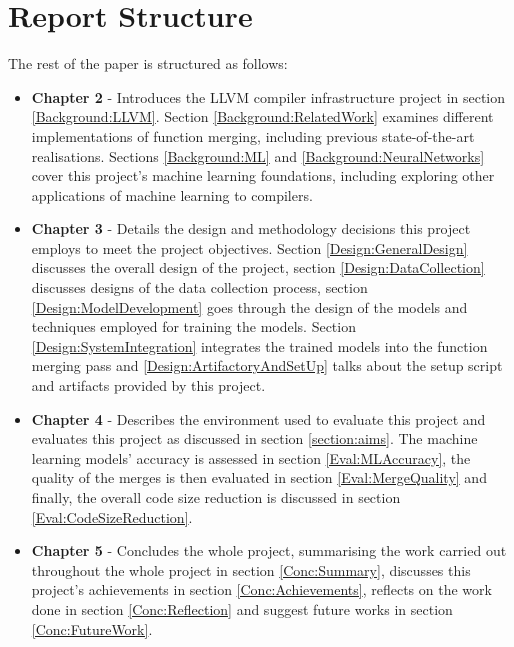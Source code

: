\section{Report Structure}
The rest of the paper is structured as follows:
\begin{itemize}
    \item \textbf{Chapter 2} - Introduces the LLVM compiler infrastructure project in section \ref{Background:LLVM}. Section \ref{Background:RelatedWork} examines different implementations of function merging, including previous state-of-the-art realisations. Sections \ref{Background:ML} and \ref{Background:NeuralNetworks} cover this project's machine learning foundations, including exploring other applications of machine learning to compilers.
    \item \textbf{Chapter 3} - Details the design and methodology decisions this project employs to meet the project objectives. Section \ref{Design:GeneralDesign} discusses the overall design of the project, section \ref{Design:DataCollection} discusses designs of the data collection process, section \ref{Design:ModelDevelopment} goes through the design of the models and techniques employed for training the models. Section \ref{Design:SystemIntegration} integrates the trained models into the function merging pass and \ref{Design:ArtifactoryAndSetUp} talks about the setup script and artifacts provided by this project.
    \item \textbf{Chapter 4} - Describes the environment used to evaluate this project and evaluates this project as discussed in section \ref{section:aims}. The machine learning models' accuracy is assessed in section \ref{Eval:MLAccuracy}, the quality of the merges is then evaluated in section \ref{Eval:MergeQuality} and finally, the overall code size reduction is discussed in section \ref{Eval:CodeSizeReduction}.
    \item \textbf{Chapter 5} - Concludes the whole project, summarising the work carried out throughout the whole project in section \ref{Conc:Summary},  discusses this project's achievements in section \ref{Conc:Achievements}, reflects on the work done in section \ref{Conc:Reflection} and suggest future works in section \ref{Conc:FutureWork}.
\end{itemize}
